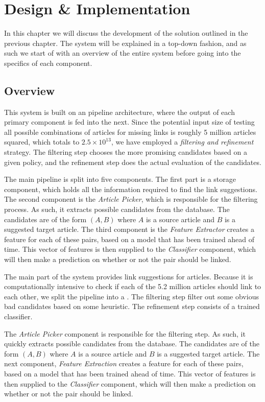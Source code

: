 \chapter{Design \& Implementation}\label{chap:design}
In this chapter we will discuss the development of the solution outlined in the previous chapter. The system will be explained in a top-down fashion, and as such we start of with an overview of the entire system before going into the specifics of each component.

\section{Overview}\label{sec:design_overview}
This system is built on an pipeline architecture, where the output of each primary component is fed into the next. Since the potential input size of testing all possible combinations of articles for missing links is roughly 5 million articles squared, which totals to $2.5 \times 10^{13}$, we have employed a \emph{filtering and refinement} strategy. The filtering step chooses the more promising candidates based on a given policy, and the refinement step does the actual evaluation of the candidates.

The main pipeline is split into five components. The first part is a storage component, which holds all the information required to find the link suggestions. The second component is the \emph{Article Picker}, which is responsible for the filtering process. As such, it extracts possible candidates from the database. The candidates are of the form $(A,B)$ where $A$ is a source article and $B$ is a suggested target article. The third component is the \emph{Feature Extractor} creates a feature for each of these pairs, based on a model that has been trained ahead of time. This vector of features is then supplied to the \emph{Classifier} component, which will then make a prediction on whether or not the pair should be linked.


The main part of the system provides link suggestions for articles. Because it is computationally intensive to check if each of the 5.2 million articles should link to each other, we split the pipeline into a . The filtering step filter out some obvious bad candidates based on some heuristic. The refinement step consists of a trained classifier.

The \emph{Article Picker} component is responsible for the filtering step. As such, it quickly extracts possible candidates from the database. The candidates are of the form $(A,B)$ where $A$ is a source article and $B$ is a suggested target article. The next component, \emph{Feature Extraction} creates a feature for each of these pairs, based on a model that has been trained ahead of time. This vector of features is then supplied to the \emph{Classifier} component, which will then make a prediction on whether or not the pair should be linked.

